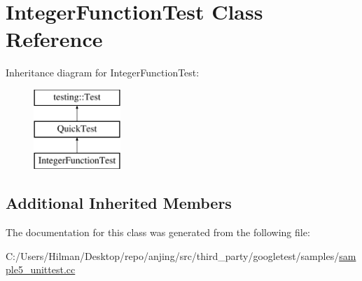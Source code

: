 \hypertarget{class_integer_function_test}{}\section{Integer\+Function\+Test Class Reference}
\label{class_integer_function_test}
Inheritance diagram for Integer\+Function\+Test\+:\begin{figure}[H]
\begin{center}
\leavevmode
\includegraphics[height=3.000000cm]{class_integer_function_test}
\end{center}
\end{figure}
\subsection*{Additional Inherited Members}


The documentation for this class was generated from the following file\+:\begin{DoxyCompactItemize}
\item 
C\+:/\+Users/\+Hilman/\+Desktop/repo/anjing/src/third\+\_\+party/googletest/samples/\hyperlink{sample5__unittest_8cc}{sample5\+\_\+unittest.\+cc}\end{DoxyCompactItemize}
